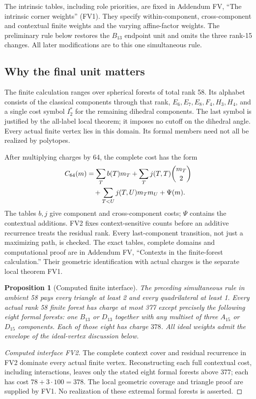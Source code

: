 \documentclass[11pt]{article}
\newtheorem{proposition}[theorem]{Proposition}
\theoremstyle{remark}\newtheorem{remark}[theorem]{Remark}
\numberwithin{equation}{section}
\begin{document}
The intrinsic tables, including role priorities, are fixed in
Addendum FV, ``The intrinsic corner weights'' (FV1). They specify
within-component, cross-component and contextual finite weights
and the varying affine-factor weights. The preliminary rule below
restores the $B_{13}$ endpoint unit and omits the three rank-15
changes. All later modifications are to this one simultaneous rule.

\subsection{Why the final unit matters}

The finite calculation ranges over spherical forests of total rank 58.
Its alphabet consists of the classical components through that rank,
$E_6,E_7,E_8,F_4,H_3,H_4$, and a single cost symbol $I_2^*$ for the
remaining dihedral components. The last symbol is justified by the
all-label local theorem; it imposes no cutoff on the dihedral angle.
Every actual finite vertex lies in this domain. Its formal members
need not all be realized by polytopes.

After multiplying charges by 64, the complete cost has the form
\begin{align}\label{eq:forest}
C_{64}(m)&=\sum_T b(T)m_T+\sum_Tj(T,T)\binom{m_T}{2}\notag\\
&\quad+\sum_{T<U}j(T,U)m_Tm_U+\Psi(m).
\end{align}
The tables $b,j$ give component and cross-component costs; $\Psi$
contains the contextual additions. FV2 fixes context-sensitive
counts before an additive recurrence treats the residual rank.
Every last-component transition, not just a maximizing path,
is checked. The exact tables, complete domains and computational
proof are in Addendum FV, ``Contexts in the finite-forest
calculation.'' Their geometric identification with actual charges
is the separate local theorem FV1.

\begin{proposition}[Computed finite interface]\label{fv:prop:oldcount}
The preceding simultaneous rule in ambient 58 pays every triangle at
least 2 and every quadrilateral at least 1. Every actual rank 58 finite
forest has charge at most 377 except precisely the following eight formal
forests: one $B_{13}$ or $D_{13}$ together with any multiset of three
 $A_{15}$ or $D_{15}$ components. Each of those eight has charge $378$.
All ideal weights admit the envelope of the ideal-vertex discussion below.
\end{proposition}
\begin{proof}[Computed interface FV2]
The complete context cover and residual recurrence in FV2 dominate
every actual finite vertex. Reconstructing each full contextual
cost, including interactions, leaves only the stated eight formal
forests above 377; each has cost $78+3\cdot100=378$.
The local geometric coverage and triangle proof are supplied by
FV1. No realization of these extremal formal forests is asserted.
\end{proof}
\end{document}
